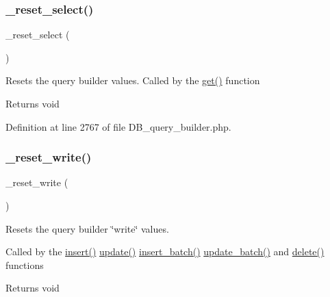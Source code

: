 \subsubsection{\texorpdfstring{\_reset\_select()}{\_reset\_select()}}
{\footnotesize\ttfamily \+\_\+reset\+\_\+select (\begin{DoxyParamCaption}{ }\end{DoxyParamCaption})\hspace{0.3cm}{\ttfamily [protected]}}

Resets the query builder values. Called by the \mbox{\hyperlink{class_c_i___d_b__query__builder_a02c629b7cdb54c95ccc23c21d910320d}{get()}} function

\begin{DoxyReturn}{Returns}
void 
\end{DoxyReturn}


Definition at line 2767 of file D\+B\+\_\+query\+\_\+builder.\+php.

\mbox{\label{class_c_i___d_b__query__builder_ae49808f6becc0366eef957756c8309e4}} 
\subsubsection{\texorpdfstring{\_reset\_write()}{\_reset\_write()}}
{\footnotesize\ttfamily \+\_\+reset\+\_\+write (\begin{DoxyParamCaption}{ }\end{DoxyParamCaption})\hspace{0.3cm}{\ttfamily [protected]}}

Resets the query builder \char`\"{}write\char`\"{} values.

Called by the \mbox{\hyperlink{class_c_i___d_b__query__builder_a487027d8e320a1ea657af2d7e61df389}{insert()}} \mbox{\hyperlink{class_c_i___d_b__query__builder_a130a26da2dd4e4582ee18f42d71fe6e4}{update()}} \mbox{\hyperlink{class_c_i___d_b__query__builder_ac35c8959b57eb08416e09c094371aaca}{insert\+\_\+batch()}} \mbox{\hyperlink{class_c_i___d_b__query__builder_a718928dc54d935761439538836f1e70d}{update\+\_\+batch()}} and \mbox{\hyperlink{class_c_i___d_b__query__builder_a482722b9989c53ed8ecd68b22df64507}{delete()}} functions

\begin{DoxyReturn}{Returns}
void 
\end{DoxyReturn}


